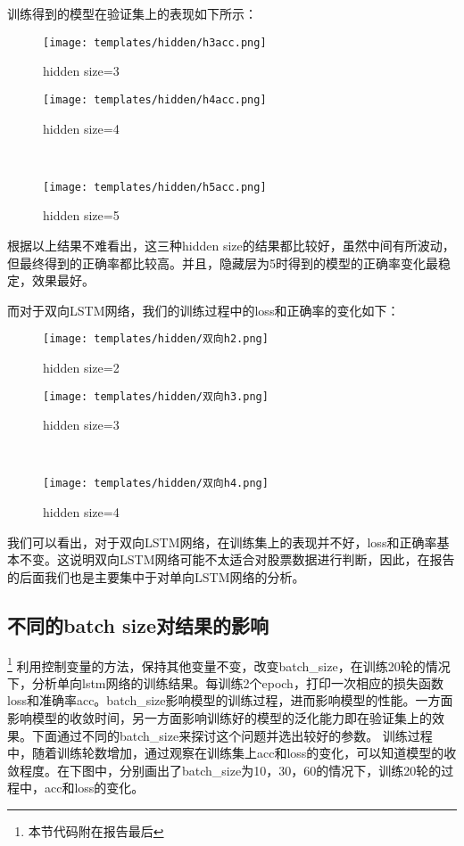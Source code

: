 \documentclass[addpoints,answers]{exam}
\begin{document}
训练得到的模型在验证集上的表现如下所示：
\begin{figure}[H]
\centering
\begin{minipage}[t]{0.48\textwidth}
\centering
\texttt{[image: templates/hidden/h3acc.png]}
\caption{hidden size=3}
\end{minipage}
\begin{minipage}[t]{0.48\textwidth}
\centering
\texttt{[image: templates/hidden/h4acc.png]}
\caption{hidden size=4}
\end{minipage}\\
\begin{minipage}[t]{0.48\textwidth}
\centering
\texttt{[image: templates/hidden/h5acc.png]}
\caption{hidden size=5}
\end{minipage}
\end{figure}
根据以上结果不难看出，这三种hidden size的结果都比较好，虽然中间有所波动，但最终得到的正确率都比较高。并且，隐藏层为5时得到的模型的正确率变化最稳定，效果最好。

而对于双向LSTM网络，我们的训练过程中的loss和正确率的变化如下：
\begin{figure}[H]
\centering
\begin{minipage}[t]{0.48\textwidth}
\centering
\texttt{[image: templates/hidden/双向h2.png]}
\caption{hidden size=2}
\end{minipage}
\begin{minipage}[t]{0.48\textwidth}
\centering
\texttt{[image: templates/hidden/双向h3.png]}
\caption{hidden size=3}
\end{minipage}\\
\begin{minipage}[t]{0.48\textwidth}
\centering
\texttt{[image: templates/hidden/双向h4.png]}
\caption{hidden size=4}
\end{minipage}
\end{figure}
我们可以看出，对于双向LSTM网络，在训练集上的表现并不好，loss和正确率基本不变。这说明双向LSTM网络可能不太适合对股票数据进行判断，因此，在报告的后面我们也是主要集中于对单向LSTM网络的分析。
\subsection{不同的batch size对结果的影响}\footnote{本节代码附在报告最后}
利用控制变量的方法，保持其他变量不变，改变batch\_size，在训练20轮的情况下，分析单向lstm网络的训练结果。每训练2个epoch，打印一次相应的损失函数loss和准确率acc。batch\_size影响模型的训练过程，进而影响模型的性能。一方面影响模型的收敛时间，另一方面影响训练好的模型的泛化能力即在验证集上的效果。下面通过不同的batch\_size来探讨这个问题并选出较好的参数。
训练过程中，随着训练轮数增加，通过观察在训练集上acc和loss的变化，可以知道模型的收敛程度。在下图中，分别画出了batch\_size为10，30，60的情况下，训练20轮的过程中，acc和loss的变化。
\end{document}
